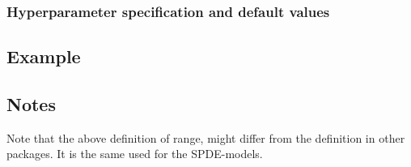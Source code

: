 \documentclass[a4paper,11pt]{article}
\begin{document}
\subsubsection*{Hyperparameter specification and default values}



\subsection*{Example}

{\small}

\subsection*{Notes}

Note that the above definition of range, might differ from the
definition in other packages. It is the same used for the SPDE-models.
\end{document}
